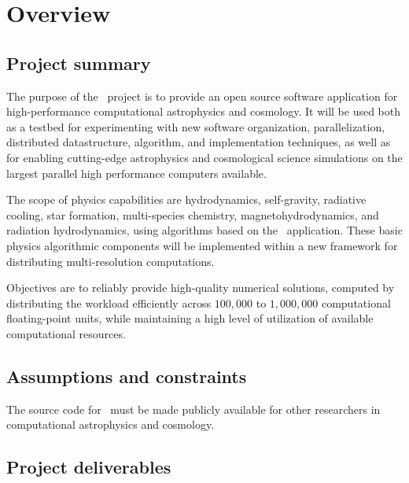 \documentclass{article}[12pt]
\begin{document}

\section{Overview} \label{s:overview}

\subsection{Project summary}

The purpose of the \cello\ project is to provide an open source
software application for high-performance computational astrophysics
and cosmology.  It will be used both as a testbed for experimenting
with new software organization, parallelization, distributed
datastructure, algorithm, and implementation techniques, as well as
for enabling cutting-edge astrophysics and cosmological science
simulations on the largest parallel high performance computers
available.

The scope of physics capabilities are hydrodynamics, self-gravity,
radiative cooling, star formation, multi-species chemistry,
magnetohydrodynamics, and radiation hydrodynamics, using algorithms
based on the \enzo\ application.  These basic physics algorithmic
components will be implemented within a new framework for distributing
multi-resolution computations.

Objectives are to reliably provide high-quality numerical solutions,
computed by distributing the workload efficiently across $100,000$ to
$1,000,000$ computational floating-point units, while maintaining a
high level of utilization of available computational resources.

\subsection{Assumptions and constraints}

The source code for \cello\ must be made publicly available for
other researchers in computational astrophysics and cosmology.

\subsection{Project deliverables}
\end{document}
